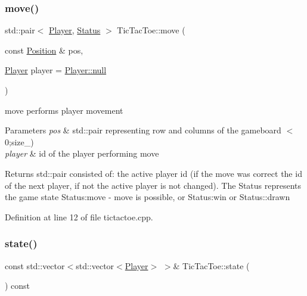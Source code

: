 \subsubsection{\texorpdfstring{move()}{move()}}
{\footnotesize\ttfamily std\+::pair$<$ \hyperlink{common__defs_8h_a9c8780378078e51e7c9041cbac392db9}{Player}, \hyperlink{common__defs_8h_a67a0db04d321a74b7e7fcfd3f1a3f70b}{Status} $>$ Tic\+Tac\+Toe\+::move (\begin{DoxyParamCaption}\item[{const \hyperlink{common__defs_8h_af9623b96ea87eb8f2d0fe97e45b0f79a}{Position} \&}]{pos,  }\item[{\hyperlink{common__defs_8h_a9c8780378078e51e7c9041cbac392db9}{Player}}]{player = {\ttfamily \hyperlink{common__defs_8h_a9c8780378078e51e7c9041cbac392db9a37a6259cc0c1dae299a7866489dff0bd}{Player\+::null}} }\end{DoxyParamCaption})}



move performs player movement 


\begin{DoxyParams}{Parameters}
{\em pos} & std\+::pair representing row and columns of the gameboard $<$0;size\+\_\+) \\
\hline
{\em player} & id of the player performing move \\
\hline
\end{DoxyParams}
\begin{DoxyReturn}{Returns}
std\+::pair consisted of\+: the active player id (if the move was correct the id of the next player, if not the active player is not changed). The Status represents the game state Status\+:move -\/ move is possible, or Status\+:win or Status\+::drawn 
\end{DoxyReturn}


Definition at line 12 of file tictactoe.\+cpp.

\mbox{\label{class_tic_tac_toe_a2bd8a25c0a5885b76ac84a201751b307}} 
\subsubsection{\texorpdfstring{state()}{state()}}
{\footnotesize\ttfamily const std\+::vector$<$std\+::vector$<$\hyperlink{common__defs_8h_a9c8780378078e51e7c9041cbac392db9}{Player}$>$ $>$\& Tic\+Tac\+Toe\+::state (\begin{DoxyParamCaption}{ }\end{DoxyParamCaption}) const\hspace{0.3cm}{\ttfamily [inline]}}



